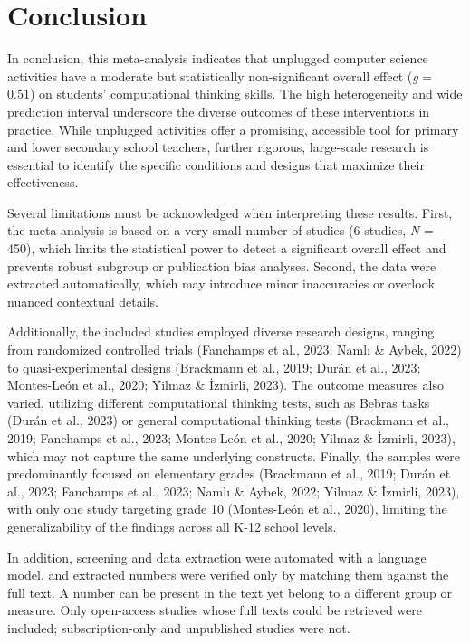 \documentclass[man,a4paper,12pt,floatsintext,nolmodern,notab]{apa7}
\begin{document}
\section{Conclusion}
In conclusion, this meta-analysis indicates that unplugged computer science activities have a moderate but statistically non-significant overall effect (\textit{g} = 0.51) on students' computational thinking skills. The high heterogeneity and wide prediction interval underscore the diverse outcomes of these interventions in practice. While unplugged activities offer a promising, accessible tool for primary and lower secondary school teachers, further rigorous, large-scale research is essential to identify the specific conditions and designs that maximize their effectiveness.

Several limitations must be acknowledged when interpreting these results. First, the meta-analysis is based on a very small number of studies (6 studies, \textit{N} = 450), which limits the statistical power to detect a significant overall effect and prevents robust subgroup or publication bias analyses. Second, the data were extracted automatically, which may introduce minor inaccuracies or overlook nuanced contextual details.

Additionally, the included studies employed diverse research designs, ranging from randomized controlled trials (Fanchamps et al., 2023; Namlı \& Aybek, 2022) to quasi-experimental designs (Brackmann et al., 2019; Durán et al., 2023; Montes-León et al., 2020; Yilmaz \& İzmirli, 2023). The outcome measures also varied, utilizing different computational thinking tests, such as Bebras tasks (Durán et al., 2023) or general computational thinking tests (Brackmann et al., 2019; Fanchamps et al., 2023; Montes-León et al., 2020; Yilmaz \& İzmirli, 2023), which may not capture the same underlying constructs. Finally, the samples were predominantly focused on elementary grades (Brackmann et al., 2019; Durán et al., 2023; Fanchamps et al., 2023; Namlı \& Aybek, 2022; Yilmaz \& İzmirli, 2023), with only one study targeting grade 10 (Montes-León et al., 2020), limiting the generalizability of the findings across all K-12 school levels.

In addition, screening and data extraction were automated with a language model, and extracted numbers were verified only by matching them against the full text. A number can be present in the text yet belong to a different group or measure. Only open-access studies whose full texts could be retrieved were included; subscription-only and unpublished studies were not.
\end{document}
